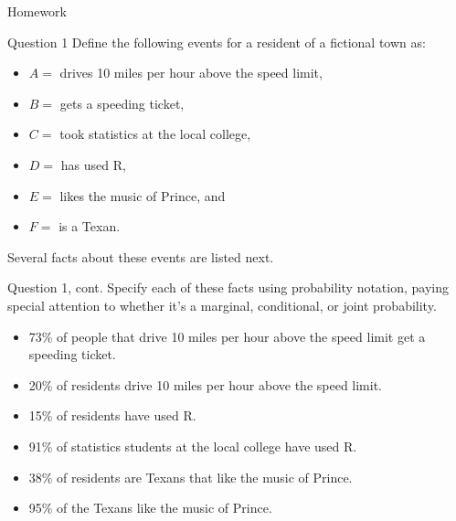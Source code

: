 \documentclass[12pt]{beamer}
\begin{document}
{
\begin{frame}{Homework}
\begin{itemize}
\color{aggiemaroon}{
\item Submit your answers before the next class.
\item You may discuss with peers but submissions must be individual.
\item Responses may be shared anonymously during class discussion!
}
\end{itemize}
\end{frame}

\begin{frame}{}
\begin{block}{Question 1}
Define the following events for a resident of a fictional town as:
\begin{itemize}
\item $A =$ drives 10 miles per hour above the speed limit,  
\item $B =$ gets a speeding ticket,  
\item $C =$ took statistics at the local college,  
\item $D =$ has used R,  
\item $E =$ likes the music of Prince, and  
\item $F =$ is a Texan.
\end{itemize}
Several facts about these events are listed next.
\end{block}
\end{frame}

\begin{frame}{}
\begin{block}{Question 1, cont.}
Specify each of these facts using probability notation, paying special attention to whether it’s a marginal, conditional, or joint probability.
\begin{itemize}
\item 73\% of people that drive 10 miles per hour above the speed limit get a speeding ticket.
\item 20\% of residents drive 10 miles per hour above the speed limit.
\item 15\% of residents have used R.
\item 91\% of statistics students at the local college have used R.
\item 38\% of residents are Texans that like the music of Prince.
\item 95\% of the Texans like the music of Prince.
\end{itemize}
\end{block}
\end{frame}

}
\end{document}
